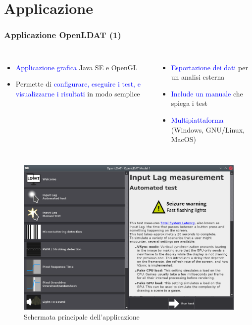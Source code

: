 \documentclass{beamer}
\begin{document}
\section{Applicazione}
\begin{frame}[shrink=15]
	\frametitle{Applicazione OpenLDAT (1)}
	\begin{columns}
		\begin{itemize}
			\item \textcolor{blue}{Applicazione grafica} Java SE e OpenGL
			\item Permette di \textcolor{blue}{configurare, eseguire i test, e visualizzarne i risultati} in modo semplice
		\end{itemize}
		\begin{itemize}
			\item \textcolor{blue}{Esportazione dei dati} per un analisi esterna
			\item \textcolor{blue}{Include un manuale} che spiega i test
			\item \textcolor{blue}{Multipiattaforma} (Windows, GNU/Linux, MacOS)
		\end{itemize}
	\end{columns}
	\begin{figure}
		\includegraphics[height=0.7\textheight]{Applicazione_files/gui_mainMenu2.png}
		\caption*{Schermata principale dell'applicazione}
	\end{figure}
\end{frame}
\end{document}
